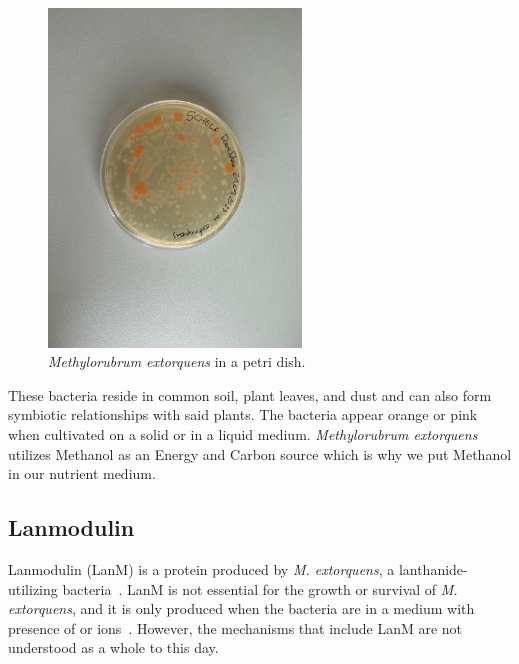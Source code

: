\begin{figure}[H]
    \centering
    \includegraphics[width=0.6\textwidth]{./media/images/mextorquens_petri_dish}
    \caption{\emph{Methylorubrum extorquens} in a petri dish.}
    \label{fig:mextorquens_petri_dish}
\end{figure}

These bacteria reside in common soil, plant leaves, and dust and can also form symbiotic
relationships with said plants. The bacteria appear orange or pink when cultivated on a
solid or in a liquid medium. \emph{Methylorubrum extorquens} utilizes Methanol as an Energy
and Carbon source which is why we put Methanol in our nutrient medium.

\subsection{Lanmodulin\authorA}

Lanmodulin (LanM) is a protein produced by \textit{M. extorquens}, a lanthanide-utilizing bacteria~\cite{lanmdiscovery}.
LanM is not essential for the growth or survival of \textit{M. extorquens}, and it is only produced when the bacteria are in a medium with presence of  or  ions~\cite{lanmroleinbiology}.
However, the mechanisms that include LanM are not understood as a whole to this day.

